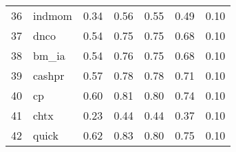 \documentclass[12pt]{article}
\begin{document}
\begin{footnotesize}
\begin{longtable}{rl|c|c|c|c|c}
36  & indmom           & 0.34                                                                                      & 0.56                                                                                        & 0.55                                                                                         & 0.49 & 0.10               \\
37  & dnco             & 0.54                                                                                      & 0.75                                                                                        & 0.75                                                                                         & 0.68 & 0.10               \\
38  & bm\_ia           & 0.54                                                                                      & 0.76                                                                                        & 0.75                                                                                         & 0.68 & 0.10               \\
39  & cashpr           & 0.57                                                                                      & 0.78                                                                                        & 0.78                                                                                         & 0.71 & 0.10               \\
40  & cp               & 0.60                                                                                      & 0.81                                                                                        & 0.80                                                                                         & 0.74 & 0.10               \\
41  & chtx             & 0.23                                                                                      & 0.44                                                                                        & 0.44                                                                                         & 0.37 & 0.10               \\
42  & quick            & 0.62                                                                                      & 0.83                                                                                        & 0.80                                                                                         & 0.75 & 0.10               \\

\end{longtable}
\end{footnotesize}
\end{document}
